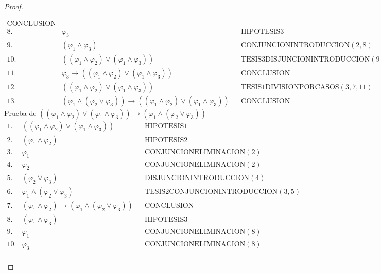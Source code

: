 \begin{proof}
\begin{enumerate}[(1)]
\[\begin{array}{llll}
                \text{CONCLUSION} \\
              8. & \varphi_{3} && \text{HIPOTESIS3} \\
              9. & (\varphi_{1} \wedge \varphi_{3}) && \text{CONJUNCIONINTRODUCCION}(2,8) \\
              10. & ((\varphi_{1} \wedge \varphi_{2}) \vee (\varphi_{1} \wedge \varphi_{3})) &&
                \text{TESIS3DISJUNCIONINTRODUCCION}(9) \\
              11. & \varphi_{3} \rightarrow ((\varphi_{1} \wedge \varphi_{2}) \vee (\varphi_{1} \wedge \varphi_{3})) &&
                \text{CONCLUSION} \\
              12. & ((\varphi_{1} \wedge \varphi_{2}) \vee (\varphi_{1} \wedge \varphi_{3})) &&
                \text{TESIS1DIVISIONPORCASOS}(3,7,11) \\
              13. & (\varphi_{1} \wedge (\varphi_{2} \vee \varphi_{3})) \rightarrow ((\varphi_{1} \wedge \varphi_{2})
                \vee (\varphi_{1} \wedge \varphi_{3})) && \text{CONCLUSION}
            \end{array}
          \]
          \PN Prueba de $((\varphi_{1} \wedge \varphi_{2}) \vee (\varphi_{1} \wedge \varphi_{3})) \rightarrow
            (\varphi_{1} \wedge (\varphi_{2} \vee \varphi_{3}))$
          \[
          \begin{array}{llll}
            1. & ((\varphi_{1} \wedge \varphi_{2}) \vee (\varphi_{1} \wedge \varphi_{3})) && \text{HIPOTESIS1} \\
            2. & (\varphi_{1} \wedge \varphi_{2}) && \text{HIPOTESIS2} \\
            3. & \varphi_{1} && \text{CONJUNCIONELIMINACION}(2) \\
            4. & \varphi_{2} && \text{CONJUNCIONELIMINACION}(2) \\
            5. & (\varphi_{2} \vee \varphi_{3}) && \text{DISJUNCIONINTRODUCCION}(4) \\
            6. & \varphi_{1} \wedge (\varphi_{2} \vee \varphi_{3}) && \text{TESIS2CONJUNCIONINTRODUCCION}(3,5) \\
            7. & (\varphi_{1} \wedge \varphi_{2})\rightarrow (\varphi_{1} \wedge (\varphi_{2} \vee \varphi_{3})) &&
              \text{CONCLUSION} \\
            8. & (\varphi_{1} \wedge \varphi_{3}) && \text{HIPOTESIS}3 \\
            9. & \varphi_{1} && \text{CONJUNCIONELIMINACION}(8) \\
            10. & \varphi_{3} && \text{CONJUNCIONELIMINACION}(8) \\

\end{array}\]
\end{enumerate}
\end{proof}
